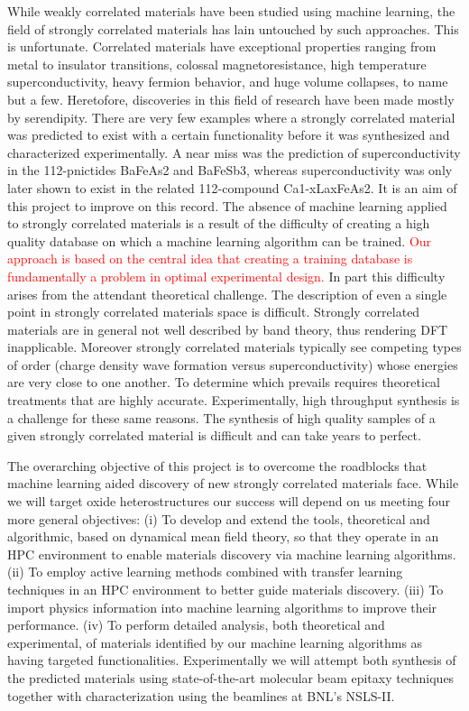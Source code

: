 \documentclass[11pt]{article}
\begin{document}
While weakly correlated materials have been studied using machine
learning, the field of strongly correlated materials has lain
untouched by such approaches. This is unfortunate. Correlated
materials have exceptional properties ranging from metal to insulator
transitions, colossal magnetoresistance, high temperature
superconductivity, heavy fermion behavior, and huge volume collapses,
to name but a few.  Heretofore, discoveries in this field of research
have been made mostly by serendipity. There are very few examples
where a strongly correlated material was predicted to exist with a
certain functionality before it was synthesized and characterized
experimentally. A near miss was the prediction of superconductivity in
the 112-pnictides BaFeAs2 and BaFeSb3, whereas superconductivity
was only later shown to exist in the related 112-compound
Ca1-xLaxFeAs2. It is an aim of this project to improve on this
record.  The absence of machine learning applied to strongly
correlated materials is a result of the difficulty of creating a high
quality database on which a machine learning algorithm can be
trained. \textcolor{red}{Our approach is based on the central idea
  that creating a training database is fundamentally a problem in
  optimal experimental design.} In part this difficulty arises from
the attendant theoretical challenge. The description of even a single
point in strongly correlated materials space is difficult. Strongly
correlated materials are in general not well described by band theory,
thus rendering DFT inapplicable. Moreover strongly correlated
materials typically see competing types of order (charge density wave
formation versus superconductivity) whose energies are very close to
one another. To determine which prevails requires theoretical
treatments that are highly accurate. Experimentally, high throughput
synthesis is a challenge for these same reasons. The synthesis of high
quality samples of a given strongly correlated material is difficult
and can take years to perfect.

The overarching objective of this project is to overcome the
roadblocks that machine learning aided discovery of new strongly
correlated materials face. While we will target oxide heterostructures
our success will depend on us meeting four more general objectives: (i)
To develop and extend the tools, theoretical and algorithmic, based on
dynamical mean field theory, so that they operate in an HPC
environment to enable materials discovery via machine learning
algorithms. (ii) To employ active learning methods combined with
transfer learning techniques in an HPC environment to better
guide materials discovery. (iii) To import physics information into
machine learning algorithms to improve their performance. (iv) To
perform detailed analysis, both theoretical and experimental, of
materials identified by our machine learning algorithms as having
targeted functionalities. Experimentally we will attempt both
synthesis of the predicted materials using state-of-the-art molecular
beam epitaxy techniques together with characterization using the
beamlines at BNL's NSLS-II.
\end{document}
